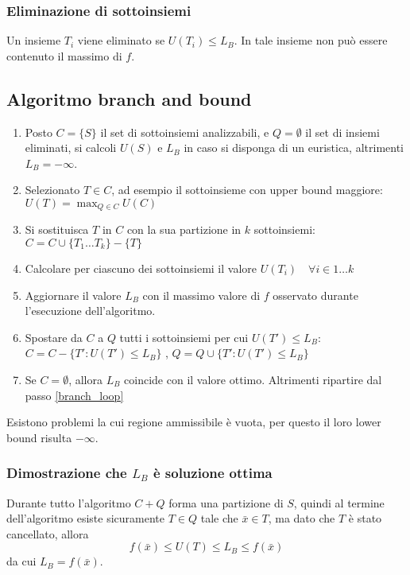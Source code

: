 \documentclass[../template]{subfiles}
\begin{document}
\subsubsection{Eliminazione di sottoinsiemi}
Un insieme $T_i$ viene eliminato se $U(T_i) \le L_B$. In tale insieme non può essere contenuto il massimo di $f$.
\subsection{Algoritmo branch and bound}
\begin{enumerate}
    \item
        Posto $C = \{S\}$ il set di sottoinsiemi analizzabili, e $Q = \emptyset$ il set di insiemi eliminati,
        si calcoli $U(S)$ e $L_B$ in caso si disponga di un euristica, altrimenti $L_B=-\infty$.

    \item\label{branch_loop}
        Selezionato $T \in C$, ad esempio il sottoinsieme con upper bound maggiore: $U(T) = \max_{Q \in C} U(C)$
    \item
        Si sostituisca $T$ in $C$ con la sua partizione in $k$ sottoinsiemi:
        $C = C \cup \{T_1 \dots T_k\} - \{T\}$
    \item
        Calcolare per ciascuno dei sottoinsiemi il valore $U(T_i) \quad \forall i \in 1\dots k$
    \item
        Aggiornare il valore $L_B$ con il massimo valore di $f$ osservato durante l'esecuzione dell'algoritmo.
    \item
        Spostare da $C$ a $Q$ tutti i sottoinsiemi per cui $U(T') \le L_B$:
        $C = C - \{T': U(T') \le L_B\}$ , $Q = Q \cup \{T': U(T') \le L_B\}$
    \item Se $C = \emptyset$, allora $L_B$ coincide con il valore ottimo. Altrimenti ripartire dal passo
        \ref{branch_loop}
\end{enumerate}
Esistono problemi la cui regione ammissibile è vuota, per questo il loro lower bound risulta $-\infty$.
\subsubsection{Dimostrazione che $L_B$ è soluzione ottima}
Durante tutto l'algoritmo $C + Q$ forma una partizione di $S$, quindi al termine dell'algoritmo esiste sicuramente $T
\in Q$ tale che $\bar{x} \in T$, ma dato che $T$ è stato cancellato, allora
\[
    f(\bar{x}) \le U(T) \le L_B \le f(\bar{x})
\]
da cui $L_B = f(\bar{x})$.
\end{document}
